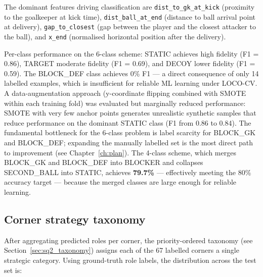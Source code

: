 The dominant features driving classification are \texttt{dist\_to\_gk\_at\_kick}
(proximity to the goalkeeper at kick time), \texttt{dist\_ball\_at\_end}
(distance to ball arrival point at delivery), \texttt{gap\_to\_closest}
(gap between the player and the closest attacker to the ball), and
\texttt{x\_end} (normalised horizontal position after the delivery).

Per-class performance on the 6-class scheme: STATIC achieves high fidelity
(F1 = 0.86), TARGET moderate fidelity (F1 = 0.69), and DECOY lower fidelity
(F1 = 0.59). The BLOCK\_DEF class achieves 0\% F1 — a direct consequence of
only 14 labelled examples, which is insufficient for reliable ML learning under
LOCO-CV. A data-augmentation approach (y-coordinate flipping combined with SMOTE
within each training fold) was evaluated but marginally reduced performance:
SMOTE with very few anchor points generates unrealistic synthetic samples that
reduce performance on the dominant STATIC class (F1 from 0.86 to 0.84).
The fundamental bottleneck for the 6-class problem is label scarcity for
BLOCK\_GK and BLOCK\_DEF; expanding the manually labelled set is the most
direct path to improvement (see Chapter~\ref{ch:plan}). The 4-class scheme,
which merges BLOCK\_GK and BLOCK\_DEF into BLOCKER and collapses SECOND\_BALL
into STATIC, achieves \textbf{79.7\%} — effectively meeting the 80\% accuracy
target — because the merged classes are large enough for reliable learning.

\subsection{Corner strategy taxonomy}
\label{sec:results_sq2_taxonomy}

After aggregating predicted roles per corner, the priority-ordered
taxonomy (see Section~\ref{sec:sq2_taxonomy}) assigns each of the 67
labelled corners a single strategic category. Using ground-truth role
labels, the distribution across the test set is:

